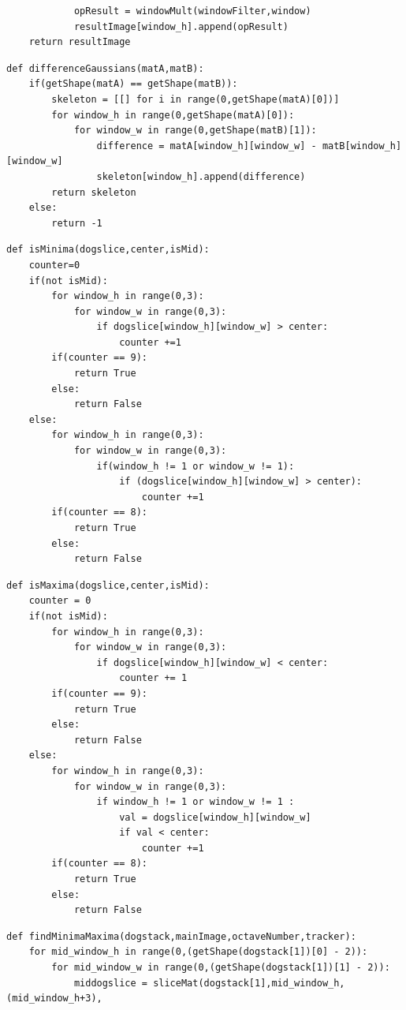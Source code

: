 \documentclass[12pt]{article}
\newenvironment{QandA}
{
	\begin{enumerate}[label=\normalfont\arabic*.,leftmargin=2em,rightmargin=2em]\normalfont
	}
	{
	\end{enumerate}
}
\newenvironment{codelalala}{}{}
\newenvironment{answered}{\setlength{\parindent}{1em}\par\normalfont}{}
\begin{document}
\begin{QandA}
\begin{answered}
\begin{codelalala}
\begin{verbatim}
            opResult = windowMult(windowFilter,window)
            resultImage[window_h].append(opResult)
    return resultImage
\end{verbatim}
\begin{verbatim}
def differenceGaussians(matA,matB):
    if(getShape(matA) == getShape(matB)):
        skeleton = [[] for i in range(0,getShape(matA)[0])]
        for window_h in range(0,getShape(matA)[0]):
            for window_w in range(0,getShape(matB)[1]):
                difference = matA[window_h][window_w] - matB[window_h][window_w] 
                skeleton[window_h].append(difference)
        return skeleton
    else:
        return -1
\end{verbatim}
\begin{verbatim}
def isMinima(dogslice,center,isMid):
    counter=0
    if(not isMid):
        for window_h in range(0,3):
            for window_w in range(0,3):
                if dogslice[window_h][window_w] > center:
                    counter +=1
        if(counter == 9):
            return True
        else:
            return False
    else:
        for window_h in range(0,3):
            for window_w in range(0,3):
                if(window_h != 1 or window_w != 1):
                    if (dogslice[window_h][window_w] > center):
                        counter +=1
        if(counter == 8):
            return True
        else:
            return False
\end{verbatim}
\begin{verbatim}
def isMaxima(dogslice,center,isMid):
    counter = 0
    if(not isMid):
        for window_h in range(0,3):
            for window_w in range(0,3):
                if dogslice[window_h][window_w] < center:
                    counter += 1
        if(counter == 9):
            return True
        else:
            return False
    else:
        for window_h in range(0,3):
            for window_w in range(0,3):
                if window_h != 1 or window_w != 1 :
                    val = dogslice[window_h][window_w]
                    if val < center:
                        counter +=1
        if(counter == 8):
            return True
        else:
            return False
\end{verbatim}
\begin{verbatim}
def findMinimaMaxima(dogstack,mainImage,octaveNumber,tracker):
    for mid_window_h in range(0,(getShape(dogstack[1])[0] - 2)):
        for mid_window_w in range(0,(getShape(dogstack[1])[1] - 2)):
            middogslice = sliceMat(dogstack[1],mid_window_h,(mid_window_h+3),

\end{verbatim}
\end{codelalala}
\end{answered}
\end{QandA}
\end{document}
